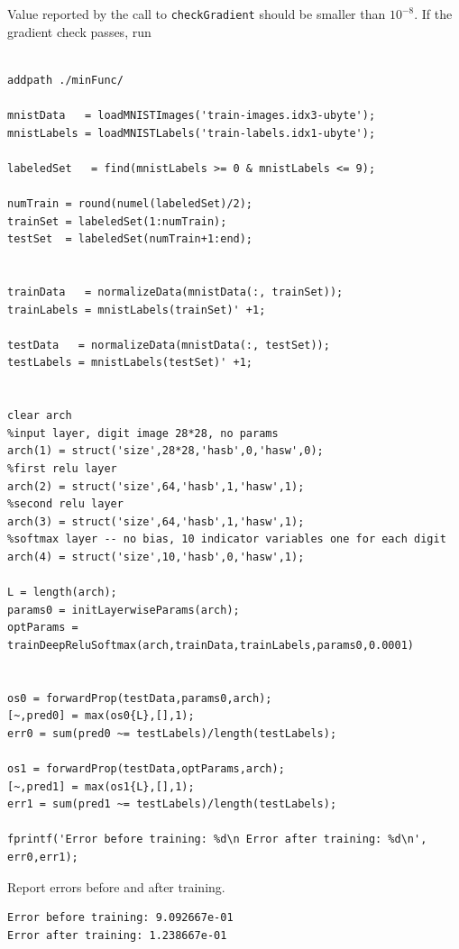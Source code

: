 \documentclass{article}
\begin{document}
Value reported by the call to \texttt{checkGradient} should be smaller than $10^{-8}$.
\newproblem{1pt}
If the gradient check passes, run
\begin{verbatim}

addpath ./minFunc/

mnistData   = loadMNISTImages('train-images.idx3-ubyte');
mnistLabels = loadMNISTLabels('train-labels.idx1-ubyte');

labeledSet   = find(mnistLabels >= 0 & mnistLabels <= 9);

numTrain = round(numel(labeledSet)/2);
trainSet = labeledSet(1:numTrain);
testSet  = labeledSet(numTrain+1:end);


trainData   = normalizeData(mnistData(:, trainSet));
trainLabels = mnistLabels(trainSet)' +1;

testData   = normalizeData(mnistData(:, testSet));
testLabels = mnistLabels(testSet)' +1;


clear arch
%input layer, digit image 28*28, no params
arch(1) = struct('size',28*28,'hasb',0,'hasw',0);
%first relu layer
arch(2) = struct('size',64,'hasb',1,'hasw',1);
%second relu layer
arch(3) = struct('size',64,'hasb',1,'hasw',1);
%softmax layer -- no bias, 10 indicator variables one for each digit
arch(4) = struct('size',10,'hasb',0,'hasw',1);

L = length(arch);
params0 = initLayerwiseParams(arch);
optParams = trainDeepReluSoftmax(arch,trainData,trainLabels,params0,0.0001)


os0 = forwardProp(testData,params0,arch);
[~,pred0] = max(os0{L},[],1);
err0 = sum(pred0 ~= testLabels)/length(testLabels);

os1 = forwardProp(testData,optParams,arch);
[~,pred1] = max(os1{L},[],1);
err1 = sum(pred1 ~= testLabels)/length(testLabels);

fprintf('Error before training: %d\n Error after training: %d\n', err0,err1);
\end{verbatim}
Report errors before and after training.
\begin{verbatim}
Error before training: 9.092667e-01
Error after training: 1.238667e-01
\end{verbatim}
\end{document}
